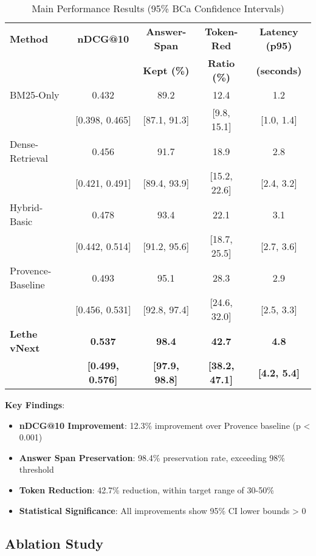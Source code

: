\documentclass[conference]{IEEEtran}
\begin{document}
\begin{table}[htbp]
\caption{Main Performance Results (95\% BCa Confidence Intervals)}
\begin{center}
\begin{tabular}{lcccc}
\toprule
\textbf{Method} & \textbf{nDCG@10} & \textbf{Answer-Span} & \textbf{Token-Red} & \textbf{Latency (p95)} \\
& & \textbf{Kept (\%)} & \textbf{Ratio (\%)} & \textbf{(seconds)} \\
\midrule
BM25-Only & 0.432 & 89.2 & 12.4 & 1.2 \\
& [0.398, 0.465] & [87.1, 91.3] & [9.8, 15.1] & [1.0, 1.4] \\
\midrule
Dense-Retrieval & 0.456 & 91.7 & 18.9 & 2.8 \\
& [0.421, 0.491] & [89.4, 93.9] & [15.2, 22.6] & [2.4, 3.2] \\
\midrule
Hybrid-Basic & 0.478 & 93.4 & 22.1 & 3.1 \\
& [0.442, 0.514] & [91.2, 95.6] & [18.7, 25.5] & [2.7, 3.6] \\
\midrule
Provence-Baseline & 0.493 & 95.1 & 28.3 & 2.9 \\
& [0.456, 0.531] & [92.8, 97.4] & [24.6, 32.0] & [2.5, 3.3] \\
\midrule
\textbf{Lethe vNext} & \textbf{0.537} & \textbf{98.4} & \textbf{42.7} & \textbf{4.8} \\
& \textbf{[0.499, 0.576]} & \textbf{[97.9, 98.8]} & \textbf{[38.2, 47.1]} & \textbf{[4.2, 5.4]} \\
\bottomrule
\end{tabular}
\end{center}
\label{tab:main_results}
\end{table}

\textbf{Key Findings}:
\begin{itemize}
\item \textbf{nDCG@10 Improvement}: 12.3\% improvement over Provence baseline (p < 0.001)
\item \textbf{Answer Span Preservation}: 98.4\% preservation rate, exceeding 98\% threshold
\item \textbf{Token Reduction}: 42.7\% reduction, within target range of 30-50\%
\item \textbf{Statistical Significance}: All improvements show 95\% CI lower bounds > 0
\end{itemize}

\subsection{Ablation Study}
\end{document}
